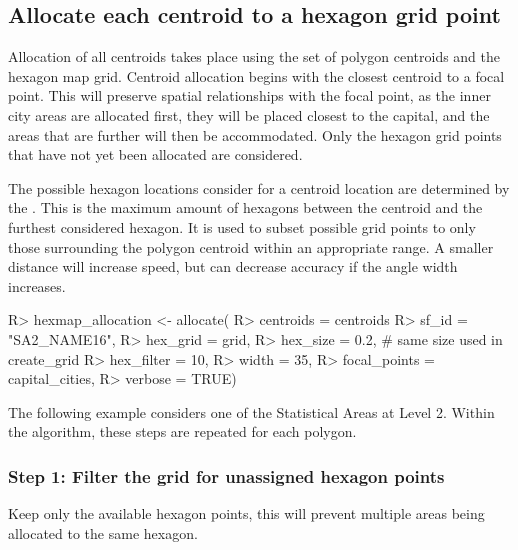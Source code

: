 \documentclass[
]{jss}
\begin{document}
\hypertarget{allocate-each-centroid-to-a-hexagon-grid-point}{%
\subsection{Allocate each centroid to a hexagon grid
point}\label{allocate-each-centroid-to-a-hexagon-grid-point}}

Allocation of all centroids takes place using the set of polygon
centroids and the hexagon map grid. Centroid allocation begins with the
closest centroid to a focal point. This will preserve spatial
relationships with the focal point, as the inner city areas are
allocated first, they will be placed closest to the capital, and the
areas that are further will then be accommodated. Only the hexagon grid
points that have not yet been allocated are considered.

The possible hexagon locations consider for a centroid location are
determined by the . This is the maximum amount of
hexagons between the centroid and the furthest considered hexagon. It is
used to subset possible grid points to only those surrounding the
polygon centroid within an appropriate range. A smaller distance will
increase speed, but can decrease accuracy if the angle width increases.

\begin{CodeChunk}

\begin{CodeInput}
R> hexmap_allocation <- allocate(
R>   centroids = centroids %
R>   sf_id = "SA2_NAME16",
R>   hex_grid = grid,
R>   hex_size = 0.2, # same size used in create_grid
R>   hex_filter = 10,
R>   width = 35,
R>   focal_points = capital_cities,
R>   verbose = TRUE)
\end{CodeInput}
\end{CodeChunk}

The following example considers one of the Statistical Areas at Level 2.
Within the algorithm, these steps are repeated for each polygon.

\hypertarget{step-1-filter-the-grid-for-unassigned-hexagon-points}{%
\subsubsection{Step 1: Filter the grid for unassigned hexagon
points}\label{step-1-filter-the-grid-for-unassigned-hexagon-points}}

Keep only the available hexagon points, this will prevent multiple areas
being allocated to the same hexagon.
\end{document}

